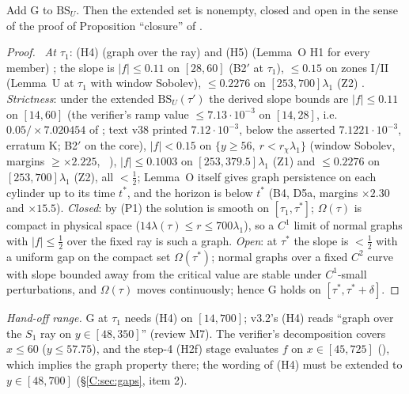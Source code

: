 \documentclass[11pt]{article}
\begin{document}
\begin{lemma}\label{C:lem:G}
Add $\mathrm{G}$ to $\mathrm{BS}_U$. Then the extended set is nonempty, closed and open in the sense of the proof of Proposition ``closure'' of .
\end{lemma}
\begin{proof}\tP\ \emph{At $\tau_1$}: (H4) (graph over the ray) and (H5) (Lemma~O H1 for every member) \tH; the slope is $|f|\le0.11$ on $[28,60]$ (B2$'$ at $\tau_1$), $\le0.15$ on zones I/II (Lemma~U at $\tau_1$ with window Sobolev), $\le0.2276$ on $[253,700]\lambda_1$ (Z2) \tC. \emph{Strictness}: under the extended $\mathrm{BS}_U(\tau')$ the derived slope bounds are $|f|\le0.11$ on $[14,60]$ (the verifier's ramp value $\le7.13\cdot10^{-3}$ on $[14,28]$, i.e.\ $0.05/\times7.020454$ of  ; text v38 printed $7.12\cdot10^{-3}$, below the asserted $7.1221\cdot10^{-3}$, erratum K; B2$'$ on the core), $|f|<0.15$ on $\{y\ge56,\ r<r_\chi\lambda_1\}$ (window Sobolev, margins $\ge\times2.225$, \SU\ ), $|f|\le0.1003$ on $[253,379.5]\lambda_1$ (Z1) and $\le0.2276$ on $[253,700]\lambda_1$ (Z2), all $<\frac12$; Lemma~O itself gives graph persistence on each cylinder up to its time $t^*$, and the horizon is below $t^*$ (B4, D5a, margins $\times2.30$ and $\times15.5$). \emph{Closed}: by (P1) the solution is smooth on $[\tau_1,\tau^*]$; $\Omega(\tau)$ is compact in physical space ($14\lambda(\tau)\le r\le700\lambda_1$), so a $C^1$ limit of normal graphs with $|f|\le\frac12$ over the fixed ray is such a graph. \emph{Open}: at $\tau^*$ the slope is $<\frac12$ with a uniform gap on the compact set $\Omega(\tau^*)$; normal graphs over a fixed $C^2$ curve with slope bounded away from the critical value are stable under $C^1$-small perturbations, and $\Omega(\tau)$ moves continuously; hence G holds on $[\tau^*,\tau^*+\delta]$.
\end{proof}
\noindent\emph{Hand-off range.} G at $\tau_1$ needs (H4) on $[14,700]$; v3.2's (H4) reads ``graph over the $S_1$ ray on $y\in[48,350]$'' (review M7). The verifier's decomposition covers $x\le60$ ($y\le57.75$), and the step-4 (H2f) stage evaluates $f$ on $x\in[45,725]$ (), which implies the graph property there; the wording of (H4) must be extended to $y\in[48,700]$ (\S\ref{C:sec:gaps}, item 2).
\end{document}
